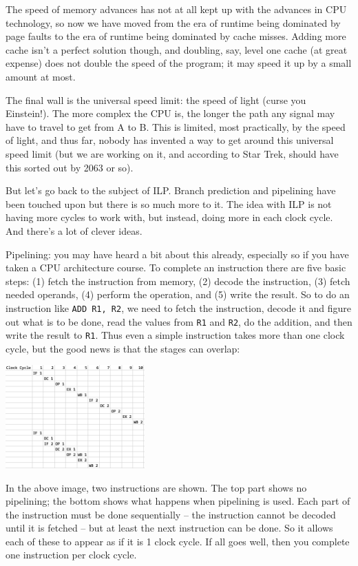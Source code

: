 \documentclass[a4paper]{report}
\begin{document}
The speed of memory advances has not at all kept up with the advances in CPU technology, so now we have moved from the era of runtime being dominated by page faults to the era of runtime being dominated by cache misses. Adding more cache isn't a perfect solution though, and doubling, say, level one cache (at great expense) does not double the speed of the program; it may speed it up by a small amount at most. 

The final wall is the universal speed limit: the speed of light (curse you Einstein!). The more complex the CPU is, the longer the path any signal may have to travel to get from A to B. This is limited, most practically, by the speed of light, and thus far, nobody has invented a way to get around this universal speed limit (but we are working on it, and according to Star Trek, should have this sorted out by 2063 or so).

But let's go back to the subject of ILP. Branch prediction and pipelining have been touched upon but there is so much more to it. The idea with ILP is not having more cycles to work with, but instead, doing more in each clock cycle. And there's a lot of clever ideas. 

Pipelining: you may have heard a bit about this already, especially so if you have taken a CPU architecture course. To complete an instruction there are five basic steps: (1) fetch the instruction from memory, (2) decode the instruction, (3) fetch needed operands, (4) perform the operation, and (5) write the result. So to do an instruction like \texttt{ADD R1, R2}, we need to fetch the instruction, decode it and figure out what is to be done, read the values from \texttt{R1} and \texttt{R2}, do the addition, and then write the result to \texttt{R1}. Thus even a simple instruction takes more than one clock cycle, but the good news is that the stages can overlap:

\begin{center}
\includegraphics[width=0.4\textwidth]{images/pipelining}
\end{center}

In the above image, two instructions are shown. The top part shows no pipelining; the bottom shows what happens when pipelining is used. Each part of the instruction must be done sequentially -- the instruction cannot be decoded until it is fetched -- but at least the next instruction can be done. So it allows each of these to appear as if it is 1 clock cycle. If all goes well, then you complete one instruction per clock cycle. 
\end{document}
